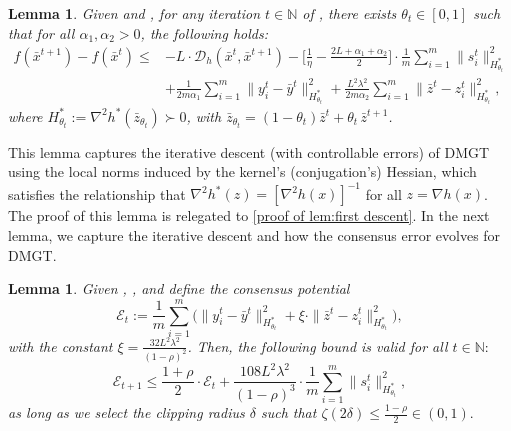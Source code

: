 \documentclass{article}
\theoremstyle{plain}
\newtheorem{lemma}[theorem]{Lemma}
\theoremstyle{definition}
\theoremstyle{remark}
\newcommand{\N}{\mathbb{N}}
\newcommand{\sL}{L}
\newcommand{\cE}{\mathcal E}
\newcommand{\cD}{\mathcal{D}_{h}}
\begin{document}
\begin{lemma}
\label{lem:first descent}
Given  and , for any iteration  $t\in\N$ of , there exists $\theta_t\in[0,1]$ such that 
for all $\alpha_1,\alpha_2>0$, the following holds: 
    \begin{equation*} \begin{aligned}
    f(\bar x^{t+1})  - f(\bar x^t)\leq & - \sL \cdot \cD(\bar x^t,\bar x^{t+1}) -\Big[\frac{1}{\eta}-\frac{2\sL+\alpha_1+\alpha_2}{2}\Big]\cdot \frac{1}{m}{\sum}_{i=1}^m\|s^t_i\|_{H_{\theta_t}^*}^2 \\& + \frac{1}{2m \alpha_1} {\sum}_{i=1}^m\|y_i^t - \bar y^t\|^2_{H_{\theta_t}^*} + \frac{\sL^2\lambda^2}{2m\alpha_2} {\sum}_{i=1}^m \|\bar z^t - z_i^t\|_{H_{\theta_t}^*}^2,
    \end{aligned} \end{equation*}
    where $H_{\theta_t}^*:=\nabla^2 h^*(\bar{z}_{\theta_t})\succ0$, with $\bar{z}_{\theta_t}=(1-\theta_t) \bar z^t + \theta_t \,\bar z^{t+1}$.
\end{lemma}
This lemma captures the iterative descent (with controllable errors) of {\sf DMGT} using the local norms induced by the kernel's (conjugation's) Hessian, which satisfies the relationship that $\nabla^2 h^*(z) = [\nabla^2 h(x)]^{-1}$ for all $z=\nabla h(x)$. The proof of this lemma is relegated to \cref{proof of lem:first descent}. In the next lemma, we capture the iterative descent and how the consensus error evolves for {\sf DMGT}.  
\begin{lemma} 
\label{lem:consensus errors}
Given , , and define the consensus potential  
\begin{equation}
    \label{def:E_t}
    \cE_t:=\frac1m{\sum}_{i=1}^m \Big(\|y_i^t - \bar y^t\|^2_{H_{\theta_t}^*} + \xi \cdot \|\bar z^{t} - z_i^{t}\|_{H_{\theta_{t}}^*}^2\Big),
\end{equation}  
with the constant $\xi = \frac{32\sL^2\lambda^2}{(1-\rho)^2}$. Then, the following bound is valid for all $t\in\N:$
\begin{equation}
    \label{eq:consensus E} 
    \cE_{t+1} \leq \frac{1+\rho}{2}\cdot \cE_t + \frac{108\sL^2\lambda^2}{(1-\rho)^{3}}\cdot \frac1m{\sum}_{i=1}^m\|s^t_i\|_{H_{\theta_t}^*}^2,
\end{equation} 
as long as we select the clipping radius $\delta$ such that $\zeta(2\delta)\leq \frac{1-\rho}{2}\in(0,1).$
\end{lemma}
\end{document}
